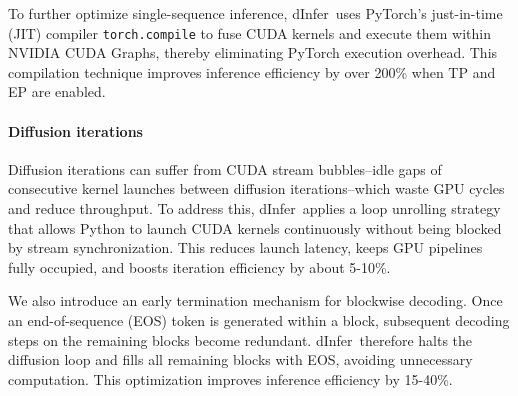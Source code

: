 \documentclass[]{antgroup}
\newcommand{\zd}[1]{{\bf\color{green}{ZD: #1}}}
\newcommand{\sys}{dInfer}
\begin{document}
To further optimize single-sequence inference, \sys~uses PyTorch's just-in-time (JIT) compiler \texttt{torch.compile} to fuse CUDA kernels and execute them within NVIDIA CUDA Graphs, thereby eliminating PyTorch execution overhead. This compilation technique improves inference efficiency by over 200\% when TP and EP are enabled.

\paragraph{Diffusion iterations}

Diffusion iterations can suffer from CUDA stream bubbles--idle gaps of consecutive kernel launches between diffusion iterations--which waste GPU cycles and reduce throughput. To address this, \sys~applies a loop unrolling strategy that allows Python to launch CUDA kernels continuously without being blocked by stream synchronization. This reduces launch latency, keeps GPU pipelines fully occupied, and boosts iteration efficiency by about 5-10\%.


We also introduce an early termination mechanism for blockwise decoding. Once an end-of-sequence (EOS) token is generated within a block, subsequent decoding steps on the remaining blocks become redundant. \sys~therefore halts the diffusion loop and fills all remaining blocks with EOS, avoiding unnecessary computation. This optimization improves inference efficiency by 15-40\%.
\end{document}
